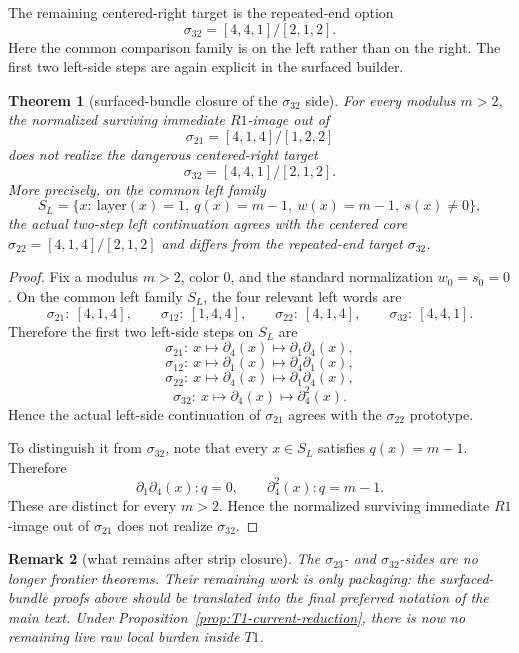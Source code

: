 \documentclass[11pt]{article}
\newtheorem{theorem}{Theorem}[section]
\newtheorem{remark}[theorem]{Remark}
\newcommand{\sig}[2]{\sigma_{#1#2}}
\begin{document}
The remaining centered-right target is the repeated-end option
\[
\sig32=[4,4,1]/[2,1,2].
\]
Here the common comparison family is on the left rather than on the right.
The first two left-side steps are again explicit in the surfaced builder.

\begin{theorem}[surfaced-bundle closure of the \(\sig32\) side]
\label{thm:sigma32-closed}
For every modulus \(m>2\), the normalized surviving immediate \(R1\)-image out
of
\[
\sig21=[4,1,4]/[1,2,2]
\]
does not realize the dangerous centered-right target
\[
\sig32=[4,4,1]/[2,1,2].
\]
More precisely, on the common left family
\[
S_L=\{x:\ \mathrm{layer}(x)=1,\ q(x)=m-1,\ w(x)=m-1,\ s(x)\neq 0\},
\]
the actual two-step left continuation agrees with the centered core
\(\sig22=[4,1,4]/[2,1,2]\) and differs from the repeated-end target
\(\sig32\).
\end{theorem}

\begin{proof}
Fix a modulus \(m>2\), color \(0\), and the standard normalization
\(w_0=s_0=0\).
On the common left family \(S_L\), the four relevant left words are
\[
\sig21:\ [4,1,4],\qquad
\sig12:\ [1,4,4],\qquad
\sig22:\ [4,1,4],\qquad
\sig32:\ [4,4,1].
\]
Therefore the first two left-side steps on \(S_L\) are
\[
\sig21:\ x\mapsto \partial_4(x)\mapsto \partial_1\partial_4(x),
\]
\[
\sig12:\ x\mapsto \partial_1(x)\mapsto \partial_4\partial_1(x),
\]
\[
\sig22:\ x\mapsto \partial_4(x)\mapsto \partial_1\partial_4(x),
\]
\[
\sig32:\ x\mapsto \partial_4(x)\mapsto \partial_4^2(x).
\]
Hence the actual left-side continuation of \(\sig21\) agrees with the
\(\sig22\) prototype.

To distinguish it from \(\sig32\), note that every \(x\in S_L\) satisfies
\(q(x)=m-1\).  Therefore
\[
\partial_1\partial_4(x): q=0,
\qquad
\partial_4^2(x): q=m-1.
\]
These are distinct for every \(m>2\).  Hence the normalized surviving
immediate \(R1\)-image out of \(\sig21\) does not realize \(\sig32\).
\end{proof}

\begin{remark}[what remains after strip closure]
The \(\sig23\)- and \(\sig32\)-sides are no longer frontier theorems.
Their remaining work is only packaging: the surfaced-bundle proofs above should
be translated into the final preferred notation of the main text.
Under Proposition~\ref{prop:T1-current-reduction}, there is now no remaining
live raw local burden inside \(T1\).
\end{remark}
\end{document}
